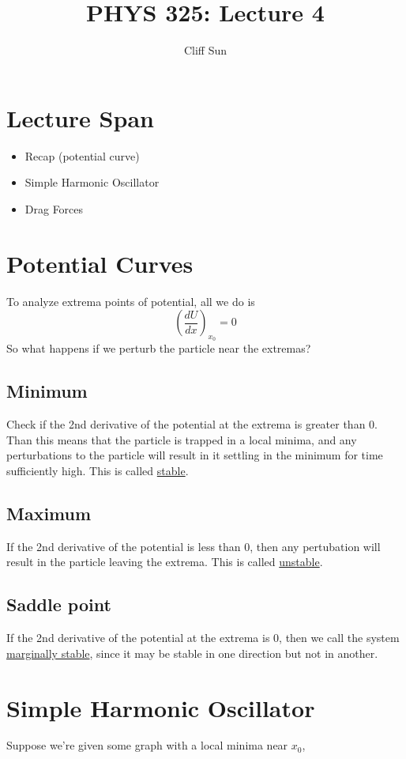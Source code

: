 \documentclass{article}
\title{PHYS 325: Lecture 4}
\author{Cliff Sun}
\newtheorem{one minute paper}[theorem]{One Minute Paper}
\begin{document}
\maketitle

\section*{Lecture Span}
\begin{itemize}
    \item Recap (potential curve)
    \item Simple Harmonic Oscillator
    \item Drag Forces
\end{itemize}

\section*{Potential Curves}
To analyze extrema points of potential, all we do is 
\begin{equation}
    \left(\frac{dU}{dx}\right)_{x_0} = 0
\end{equation}
So what happens if we perturb the particle near the extremas?

\subsection*{Minimum}
Check if the 2nd derivative of the potential at the extrema is greater than 0. Than this means that the 
particle is trapped in a local minima, and any perturbations to the particle will result in it settling in the minimum for time sufficiently high. This is called \underline{stable}. 

\subsection*{Maximum}
If the 2nd derivative of the potential is less than 0, then any pertubation will result in the particle leaving the extrema. This is called \underline{unstable}. 

\subsection*{Saddle point}
If the 2nd derivative of the potential at the extrema is 0, then we call the system \underline{marginally stable}, since it may be stable in one direction but not in another. 

\section*{Simple Harmonic Oscillator}
Suppose we're given some graph with a local minima near $x_0$,  
\end{document}
